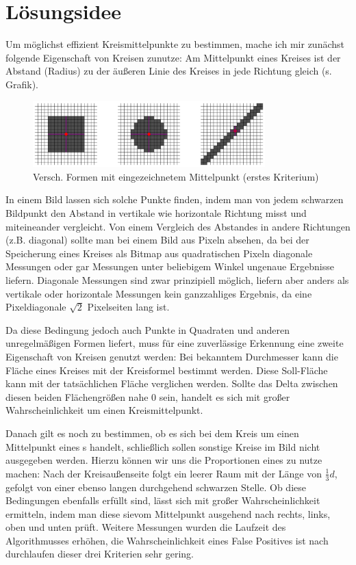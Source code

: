 \section{Lösungsidee}
Um möglichst effizient Kreismittelpunkte zu bestimmen, mache ich mir zunächst folgende Eigenschaft von Kreisen zunutze: Am Mittelpunkt eines Kreises ist der Abstand (Radius) zu der äußeren Linie des Kreises in jede Richtung gleich (s. Grafik).

\begin{figure}[!ht]
	\centering	
	\includegraphics[width=0.8\textwidth]{durchmesservergleich}
	\caption{Versch. Formen mit eingezeichnetem Mittelpunkt (erstes Kriterium)}
\end{figure}

In einem Bild lassen sich solche Punkte finden, indem man von jedem schwarzen Bildpunkt den Abstand in vertikale wie horizontale Richtung misst und miteineander vergleicht. Von einem Vergleich des Abstandes in andere Richtungen (z.B. diagonal) sollte man bei einem Bild aus Pixeln absehen, da bei der Speicherung eines Kreises als Bitmap aus quadratischen Pixeln diagonale Messungen oder gar Messungen unter beliebigem Winkel ungenaue Ergebnisse liefern. Diagonale Messungen sind zwar prinzipiell möglich, liefern aber anders als vertikale oder horizontale Messungen kein ganzzahliges Ergebnis, da eine Pixeldiagonale \(\sqrt{2}\) Pixelseiten lang ist.

Da diese Bedingung jedoch auch Punkte in Quadraten und anderen unregelmäßigen Formen liefert, muss für eine zuverlässige Erkennung eine zweite Eigenschaft von Kreisen genutzt werden: Bei bekanntem Durchmesser kann die Fläche eines Kreises mit der Kreisformel bestimmt werden. Diese Soll-Fläche kann mit der tatsächlichen Fläche verglichen werden. Sollte das Delta zwischen diesen beiden Flächengrößen nahe 0 sein, handelt es sich mit großer Wahrscheinlichkeit um einen Kreismittelpunkt.

Danach gilt es noch zu bestimmen, ob es sich bei dem Kreis um einen Mittelpunkt eines \task{}s handelt, schließlich sollen sonstige Kreise im Bild nicht ausgegeben werden. Hierzu können wir uns die Proportionen eines  zu nutze machen: Nach der Kreisaußenseite folgt ein leerer Raum mit der Länge von \(\frac{1}{3}d\), gefolgt von einer ebenso langen durchgehend schwarzen Stelle. Ob diese Bedingungen ebenfalls erfüllt sind, lässt sich mit großer Wahrscheinlichkeit ermitteln, indem man diese sievom Mittelpunkt ausgehend nach rechts, links, oben und unten prüft. Weitere Messungen wurden die Laufzeit des Algorithmusses erhöhen, die Wahrscheinlichkeit eines False Positives ist nach durchlaufen dieser drei Kriterien sehr gering.


